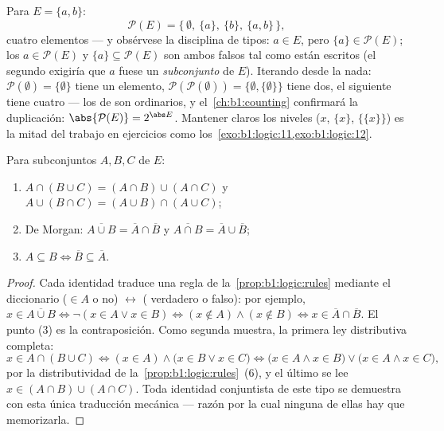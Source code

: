 \begin{example}\label{ex:b1:logic:powerset}
Para $E = \{a, b\}$:
\[
\mathcal P(E) = \bigl\{\, \emptyset,\ \{a\},\ \{b\},\ \{a, b\}
\,\bigr\},
\]
cuatro elementos --- y obsérvese la disciplina de tipos: $a \in E$, pero
$\{a\} \in \mathcal P(E)$; los  $a \in \mathcal P(E)$
y $\{a\} \subseteq \mathcal P(E)$ son ambos falsos tal como están
escritos (el segundo exigiría que $a$ fuese un \emph{subconjunto} de
$E$). Iterando desde la nada: $\mathcal P(\emptyset) = \{\emptyset\}$
tiene un elemento, $\mathcal P(\mathcal P(\emptyset)) = \{\emptyset,
\{\emptyset\}\}$ tiene dos, el siguiente tiene cuatro --- los 
de  son  ordinarios, y el~\cref{ch:b1:counting}
confirmará la duplicación: $\abs{\mathcal P(E)} = 2^{\abs E}$. Mantener
claros los niveles ($x$, $\{x\}$, $\{\{x\}\}$) es la mitad del trabajo
en ejercicios como los~\cref{exo:b1:logic:11,exo:b1:logic:12}.
\end{example}

\begin{proposition}\label{prop:b1:logic:setalgebra}
Para subconjuntos $A, B, C$ de $E$:
\begin{enumerate}
  \item $A \cap (B \cup C) = (A \cap B) \cup (A \cap C)$ y
        $A \cup (B \cap C) = (A \cup B) \cap (A \cup C)$;
  \item De Morgan: $\overline{A \cup B} = \overline{A} \cap
        \overline{B}$ y $\overline{A \cap B} = \overline{A} \cup
        \overline{B}$;
  \item $A \subseteq B \iff \overline{B} \subseteq \overline{A}$.
\end{enumerate}
\end{proposition}

\begin{proof}
Cada identidad traduce una regla de la~\cref{prop:b1:logic:rules}
mediante el diccionario ($\in A$ o no) $\leftrightarrow$ (
verdadero o falso): por ejemplo, $x \in \overline{A \cup B} \iff
\lnot(x \in A \lor x \in B) \iff (x \notin A) \land (x \notin B) \iff
x \in \overline{A} \cap \overline{B}$. El punto (3) es la contraposición.
Como segunda muestra, la primera ley distributiva completa:
\[
x \in A \cap (B \cup C)
\iff (x \in A) \land \bigl(x \in B \lor x \in C\bigr)
\iff \bigl(x \in A \land x \in B\bigr) \lor
\bigl(x \in A \land x \in C\bigr),
\]
por la distributividad de la~\cref{prop:b1:logic:rules}~(6), y el último
 se lee $x \in (A \cap B) \cup (A \cap C)$. Toda identidad
conjuntista de este tipo se demuestra con esta única traducción
mecánica --- razón por la cual ninguna de ellas hay que memorizarla.
\end{proof}

